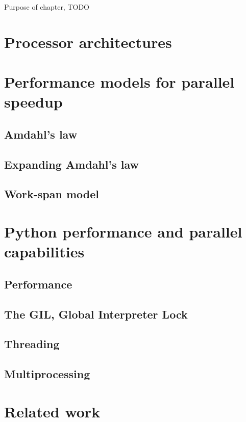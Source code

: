 Purpose of chapter, TODO

\section{Processor architectures}
\section{Performance models for parallel speedup}
\subsection{Amdahl's law}
\subsection{Expanding Amdahl's law}
\subsection{Work-span model}
\section{Python performance and parallel capabilities}
\subsection{Performance}
\subsection{The GIL, Global Interpreter Lock}
\subsection{Threading}
\subsection{Multiprocessing}

\section{Related work}
